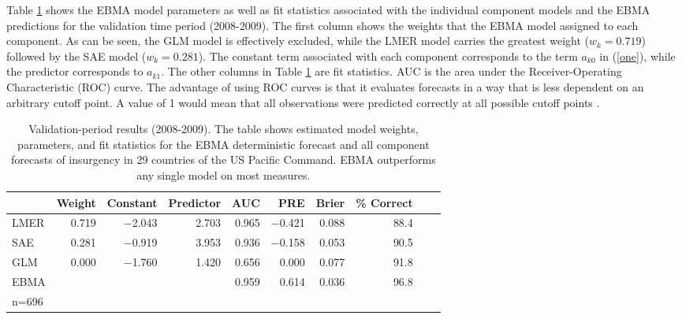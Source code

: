 Table \ref{InSam1} shows the EBMA model parameters as well as fit
statistics associated with the individual component models and the
EBMA predictions for the validation time period (2008-2009). The first
column shows the weights that the EBMA model assigned to each
component. As can be seen, the GLM model is effectively excluded,
while the LMER model carries the greatest weight ($w_k=0.719$)
followed by the SAE model ($w_k = 0.281$).  The constant term
associated with each component corresponds to the term $a_{k0}$ in
(\ref{one}), while the predictor corresponds to $a_{k1}$.  The other
columns in Table \ref{InSam1} are fit statistics.  AUC is the area
under the Receiver-Operating Characteristic (ROC) curve. The advantage
of using ROC curves is that it evaluates forecasts in a way that is
less dependent on an arbitrary cutoff point.  A value of 1 would mean
that all observations were predicted correctly at all possible cutoff
points \citep{King:Zeng:2001}.

\begin{table}[h!]
\small
\begin{center}
  \caption{\footnotesize Validation-period results (2008-2009).  The
    table shows estimated model weights, parameters, and fit
    statistics for the EBMA deterministic forecast and all component
    forecasts of insurgency in 29 countries of the US Pacific Command.  EBMA
    outperforms any single model on most measures.}\label{InSam1}
\begin{tabular}{lrrrrrrrrr}
  \toprule
 & Weight & Constant & Predictor & AUC & PRE & Brier & \% Correct \\ 
  \midrule

LMER  & 0.719 &  $-$2.043 &     2.703 & 0.965 &$-$0.421& 0.088 &      88.4  \\
SAE&   0.281&   $-$0.919&     3.953& 0.936& $-$0.158& 0.053&      90.5       \\
GLM   &0.000 &  $-$1.760     &1.420 &0.656  &0.000 &0.077&      91.8       \\
EBMA   & & & &0.959  &0.614 &0.036      &96.8       \\
\bottomrule
n=696\\
\end{tabular}
\end{center}
\end{table}

